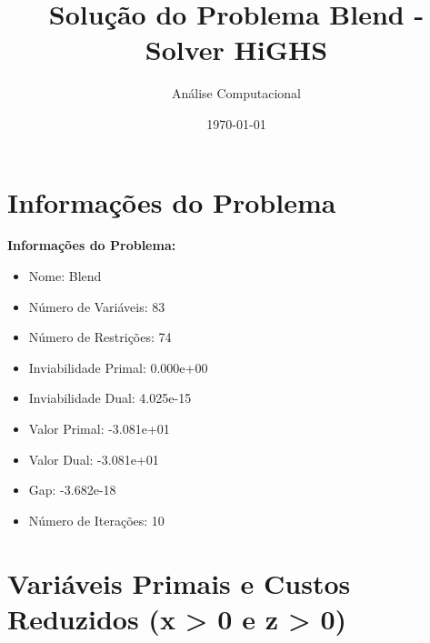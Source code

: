 \documentclass[12pt]{article}
\title{Solução do Problema Blend - Solver HiGHS}
\author{Análise Computacional}
\date{\today}
\begin{document}
\maketitle

\section{Informações do Problema}

\textbf{Informações do Problema:}
\begin{itemize}
\item Nome: Blend
\item Número de Variáveis: 83
\item Número de Restrições: 74
\item Inviabilidade Primal: 0.000e+00
\item Inviabilidade Dual: 4.025e-15
\item Valor Primal: -3.081e+01
\item Valor Dual: -3.081e+01
\item Gap: -3.682e-18
\item Número de Iterações: 10
\end{itemize}


\section{Variáveis Primais e Custos Reduzidos (x > 0 e z > 0)}
\end{document}

